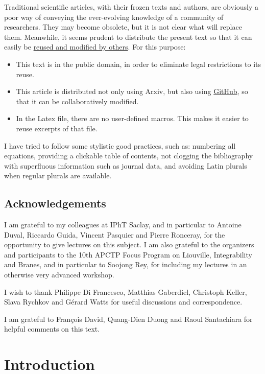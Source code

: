 \documentclass[12pt,a4paper,notitlepage]{report}
\numberwithin{equation}{section}
\theoremstyle{break}
\begin{document}
Traditional scientific articles, with their frozen texts and authors, are obviously a poor way of conveying the ever-evolving knowledge of a community of researchers.
They may become obsolete, but it is not clear what will replace them.
Meanwhile, it seems prudent to distribute the present text so that it can easily be 
\href{http://researchpracticesandtools.blogspot.fr/2014/02/the-case-for-emancipating-articles-from.html}
{reused and modified by others}.
For this purpose:
\begin{itemize}
 \item This text is in the public domain, in order to eliminate legal restrictions to its reuse. 
\item This article is distributed not only using Arxiv, but also using \href{https://github.com/ribault/CFT-Review}{GitHub}, so that it can be collaboratively modified. 
\item In the Latex file, there are no user-defined macros.
This makes it easier to reuse excerpts of that file. 
\end{itemize}

I have tried to follow some stylistic good practices, such as: numbering all equations, providing a clickable table of contents, not clogging the bibliography with superfluous information such as journal data, and avoiding Latin plurals when regular plurals are available.


\section{Acknowledgements}

I am grateful to my colleagues at IPhT Saclay, and in particular to Antoine Duval, Riccardo Guida, Vincent Pasquier and Pierre Ronceray, for the opportunity to give lectures on this subject. I am also grateful to the organizers and participants to the 10th APCTP Focus Program on Liouville, Integrability and Branes, and in particular to Soojong Rey, for including my lectures in an otherwise very advanced workshop. 

I wish to thank Philippe Di Francesco, Matthias Gaberdiel, Christoph Keller, Slava Rychkov and G\'erard Watts for useful discussions and correspondence.

I am grateful to Fran\c{c}ois David, Quang-Dien Duong and Raoul Santachiara for helpful comments on this text.

\chapter{Introduction \label{secintr}}
\end{document}
